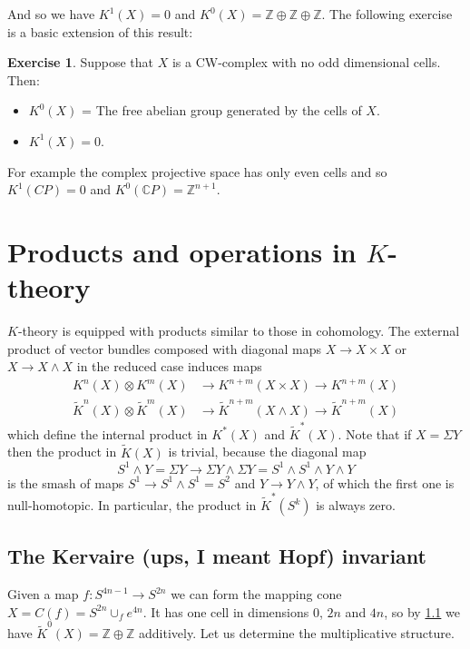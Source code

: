 \documentclass[a4paper,10pt]{article}
\theoremstyle{plain}%
\theoremstyle{definition}
\newtheorem{exer}{Exercise}
\theoremstyle{remark}
\newcommand{\ZZ}{\mathbb{Z}}
\newcommand{\CC}{\mathbb{C}}
\newcommand{\KR}{\widetilde{K}}   %
\newcommand{\cp}{\CC P}   %
\newcommand{\CP}{\cp}     %
\newcommand{\smsh}{\wedge}  %
\newcommand{\susp}{\Sigma}  %
\begin{document}
And so we have $K^1(X)=0$ and $K^0(X)=\ZZ\oplus\ZZ\oplus\ZZ$. The following exercise
is a basic extension of this result:

\begin{exer}
  Suppose that $X$ is a CW-complex with no odd dimensional cells. Then:
  \begin{itemize}
  \item $K^0(X)$ = The free abelian group generated by the cells of $X$.
    \item $K^1(X) = 0$. 
  \end{itemize}
\end{exer}

For example the complex projective space has only even cells and so $K^1(CP)=0$
 and $K^0(\CP)=\ZZ^{n+1}$.




\section{Products and operations in $K$-theory}

$K$-theory is equipped with products similar to those in cohomology. The external product of vector bundles composed with diagonal maps $X\to X\times X$ or $X\to X\smsh X$ in the reduced case induces maps
\begin{align*}
K^n(X)\otimes K^m(X)&\to K^{n+m}(X\times X)\to K^{n+m}(X)\\
\KR^n(X)\otimes \KR^m(X)&\to \KR^{n+m}(X\smsh X)\to \KR^{n+m}(X)
\end{align*}
which define the internal product in $K^*(X)$ and $\KR^*(X)$. Note that if $X=\susp Y$ then the product in $\KR(X)$ is trivial, because the diagonal map
$$S^1\smsh Y=\susp Y\to \susp Y\smsh \susp Y=S^1\smsh S^1\smsh Y\smsh Y$$
is the smash of maps $S^1\to S^1\smsh S^1=S^2$ and $Y\to Y\smsh Y$, of which the first one is null-homotopic. In particular, the product in $\KR^*(S^k)$ is always zero.

\subsection{The Kervaire (ups, I meant Hopf) invariant}
Given a map $f:S^{4n-1}\to S^{2n}$ we can form the mapping cone $X=C(f)=S^{2n}\cup_f e^{4n}$. It has one cell in dimensions $0$, $2n$ and $4n$, so by \ref{}  we have $\KR^0(X)=\ZZ\oplus\ZZ$ additively. Let us determine the multiplicative structure.
\end{document}
